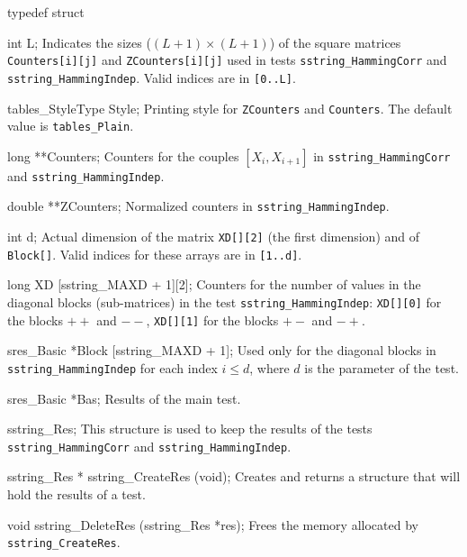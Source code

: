 typedef struct {

   int L;
\endcode
 \tabb
  Indicates the sizes ($(L+1)\times (L+1)$) of the square matrices
  {\tt Counters[i][j]} and
  {\tt  ZCounters[i][j]} used in tests  {\tt sstring\_HammingCorr} and
 {\tt  sstring\_HammingIndep}. Valid indices are in {\tt [0..L]}.
 \endtabb
\code

   tables_StyleType Style;
\endcode
 \tabb
  Printing style for {\tt ZCounters} and  {\tt Counters}.
  The default value is {\tt tables\_Plain}.
 \endtabb
\code

   long **Counters;
\endcode
 \tabb
  Counters for the couples $[X_i, X_{i+1}]$ in {\tt sstring\_HammingCorr}
  and {\tt sstring\_HammingIndep}.
 \endtabb
\code

   double **ZCounters;
\endcode
 \tabb
  Normalized counters  in {\tt sstring\_HammingIndep}.
 \endtabb
\code

   int d;
\endcode
 \tabb
  Actual dimension of the matrix {\tt XD[][2]} (the first dimension) 
  and of {\tt Block[]}. Valid indices for these arrays are in {\tt [1..d]}.
 \endtabb
\code

   long XD [sstring_MAXD + 1][2];
\endcode
 \tabb
  Counters for the number of values in the diagonal blocks
  (sub-matrices) in the test {\tt sstring\_HammingIndep}:
  {\tt XD[][0]} for the blocks $++$ and $--$, 
  {\tt XD[][1]} for the blocks $+-$ and $-+$.
 \endtabb
\code

   sres_Basic *Block [sstring_MAXD + 1];
\endcode
 \tabb
   Used only for the diagonal blocks in {\tt sstring\_HammingIndep}
   for each index $i \le d$, where $d$ is the parameter of the test.
\endtabb
\code

   sres_Basic *Bas;  
\endcode
 \tabb
  Results of the main test.
 \endtabb
\code

} sstring_Res;
\endcode
 \tab
  This structure is used to keep the results of the  tests
 {\tt sstring\_HammingCorr} and {\tt sstring\_Ham\-mingIndep}.
 \endtab
\code


sstring_Res * sstring_CreateRes (void);
\endcode
 \tab 
  Creates and returns a structure that will hold the results of a test. 
 \endtab
\code


void sstring_DeleteRes (sstring_Res *res);
\endcode
 \tab 
  Frees the memory allocated by {\tt sstring\_CreateRes}.
 \endtab

\fi   %



